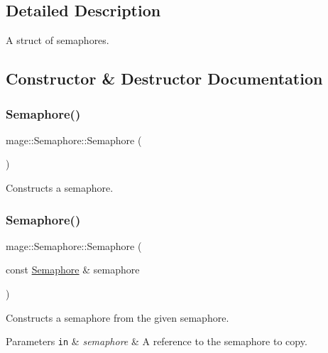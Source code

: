 \subsection{Detailed Description}
A struct of semaphores. 

\subsection{Constructor \& Destructor Documentation}
\hypertarget{structmage_1_1_semaphore_a7b4f53c18b9a244ed98ef58fa5cfa2bb}{}\label{structmage_1_1_semaphore_a7b4f53c18b9a244ed98ef58fa5cfa2bb} 
\subsubsection{\texorpdfstring{Semaphore()}{Semaphore()}\hspace{0.1cm}{\footnotesize\ttfamily [1/3]}}
{\footnotesize\ttfamily mage\+::\+Semaphore\+::\+Semaphore (\begin{DoxyParamCaption}{ }\end{DoxyParamCaption})}

Constructs a semaphore. \hypertarget{structmage_1_1_semaphore_a8873b2ed82ff66d323a8c3cebf0fb5c0}{}\label{structmage_1_1_semaphore_a8873b2ed82ff66d323a8c3cebf0fb5c0} 
\subsubsection{\texorpdfstring{Semaphore()}{Semaphore()}\hspace{0.1cm}{\footnotesize\ttfamily [2/3]}}
{\footnotesize\ttfamily mage\+::\+Semaphore\+::\+Semaphore (\begin{DoxyParamCaption}\item[{const \hyperlink{structmage_1_1_semaphore}{Semaphore} \&}]{semaphore }\end{DoxyParamCaption})\hspace{0.3cm}{\ttfamily [delete]}}

Constructs a semaphore from the given semaphore.


\begin{DoxyParams}[1]{Parameters}
\mbox{\tt in}  & {\em semaphore} & A reference to the semaphore to copy. \\
\hline
\end{DoxyParams}
\hypertarget{structmage_1_1_semaphore_a78484faaaff49a28c1f9ec7ad61f526f}{}\label{structmage_1_1_semaphore_a78484faaaff49a28c1f9ec7ad61f526f} 
